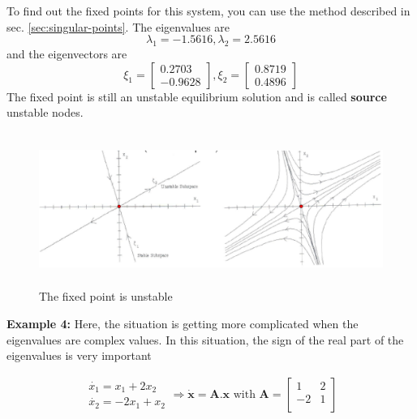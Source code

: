 To find out the fixed points for this system, you can use the method
described in sec. \ref{sec:singular-points}. The eigenvalues are
\begin{equation}
  \label{eq:107}
  \lambda_1 = -1.5616 , \lambda_2 = 2.5616
\end{equation}
and the eigenvectors are
\begin{equation}
  \label{eq:108}
  \xi_1 = \left[
    \begin{array}{c}
      0.2703 \\
      -0.9628
    \end{array}
    \right]
    ,
  \xi_2 = \left[
    \begin{array}{c}
     0.8719 \\
      0.4896
    \end{array}
    \right]
\end{equation}
The fixed point is still an unstable equilibrium solution and is
called {\bf source} unstable nodes.
\begin{figure}[htb]
  \centerline{\includegraphics[height=5cm]{./images/unstable_subspace.eps}}
  \caption{The fixed point is unstable}\label{fig:unstable_subspace}
\end{figure}

{\bf Example 4:} Here, the situation is getting more complicated when
the eigenvalues are complex values. In this situation, the sign of the
real part of the eigenvalues is very important

\begin{equation}
  \label{eq:1063}
  \begin{split}
    \begin{array}{c}
          \dot{x_1} = x_1 + 2x_2 \\
    \dot{x_2} = -2x_1 + x_2
    \end{array}
\Rightarrow
\mathbf{\dot{x} = A.x}
\text{ with } \mathbf{A} = \left[
\begin{array}{cc}
  1 & 2 \\
  -2 & 1 \\
\end{array}
\right]
  \end{split}
\end{equation}


